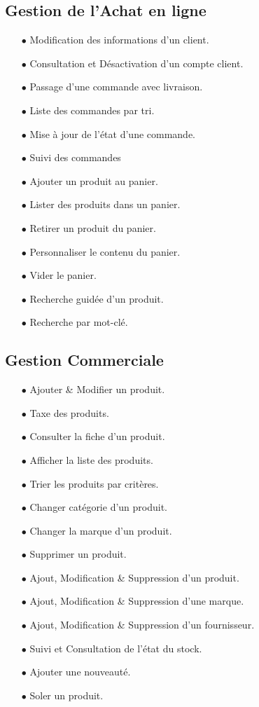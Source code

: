 \subsection{Gestion de l'Achat en ligne}
\vspace{.3cm}
\begin{itemize}
\item[$\bullet$] Modification des informations d'un client.
\item[$\bullet$] Consultation et Désactivation d'un compte client.
\item[$\bullet$] Passage d'une commande avec livraison.
\item[$\bullet$] Liste des commandes par tri.
\item[$\bullet$] Mise à jour de l'état d'une commande.
\item[$\bullet$] Suivi des commandes
\item[$\bullet$] Ajouter un produit au panier.
\item[$\bullet$] Lister des produits dans un panier.
\item[$\bullet$] Retirer un produit du panier.
\item[$\bullet$] Personnaliser le contenu du panier.
\item[$\bullet$] Vider le panier.
\item[$\bullet$] Recherche guidée d'un produit.
\item[$\bullet$] Recherche par mot-clé.
\end{itemize}
\vspace{.3cm}
\subsection{Gestion Commerciale}
\vspace{.3cm}
\begin{itemize}
\item[$\bullet$] Ajouter \& Modifier un produit.
\item[$\bullet$] Taxe des produits.
\item[$\bullet$] Consulter la fiche d'un produit.
\item[$\bullet$] Afficher la liste des produits.
\item[$\bullet$] Trier les produits par critères.
\item[$\bullet$] Changer catégorie d'un produit.
\item[$\bullet$] Changer la marque d'un produit.
\item[$\bullet$] Supprimer un produit.
\item[$\bullet$] Ajout, Modification \& Suppression d'un produit.
\item[$\bullet$] Ajout, Modification \& Suppression d'une marque.
\item[$\bullet$] Ajout, Modification \& Suppression d'un fournisseur.
\item[$\bullet$] Suivi et Consultation de l'état du stock.
\item[$\bullet$] Ajouter une nouveauté.
\item[$\bullet$] Soler un produit.
\end{itemize}
\vspace{.3cm}
